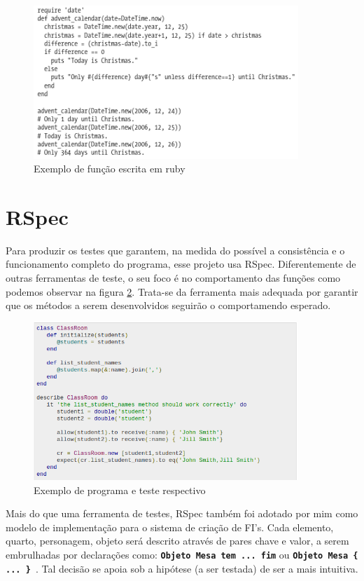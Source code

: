 \begin{figure}
  \includegraphics[width=10cm]{figuras/ruby}
  \caption{Exemplo de função escrita em ruby}
  \label{fig:ruby}
\end{figure}

\section{RSpec}
\label{sec:rspec}

Para produzir os testes que garantem, na medida do possível a consistência e o
funcionamento completo do programa, esse projeto usa RSpec. Diferentemente de
outras ferramentas de teste, o seu foco é no comportamento das funções como
podemos observar na figura \ref{fig:rspec}. Trata-se da ferramenta mais adequada
por garantir que os métodos a serem desenvolvidos seguirão o comportamendo
esperado.

\begin{figure}[htb]
\includegraphics[width=10cm]{figuras/rspec}
\caption{\label{fig:rspec} Exemplo de programa e teste respectivo}
\end{figure}

Mais do que uma ferramenta de testes, RSpec também foi adotado por mim como
modelo de implementação para o sistema de criação de FI's. Cada elemento,
quarto, personagem, objeto será descrito através de pares chave e valor, a serem
embrulhadas por declarações como: \textbf{\texttt{Objeto Mesa tem ... fim}} ou
\textbf{\texttt{Objeto Mesa \{ ... \} }}. Tal decisão se apoia sob a hipótese (a
ser testada) de ser a mais intuitiva.
